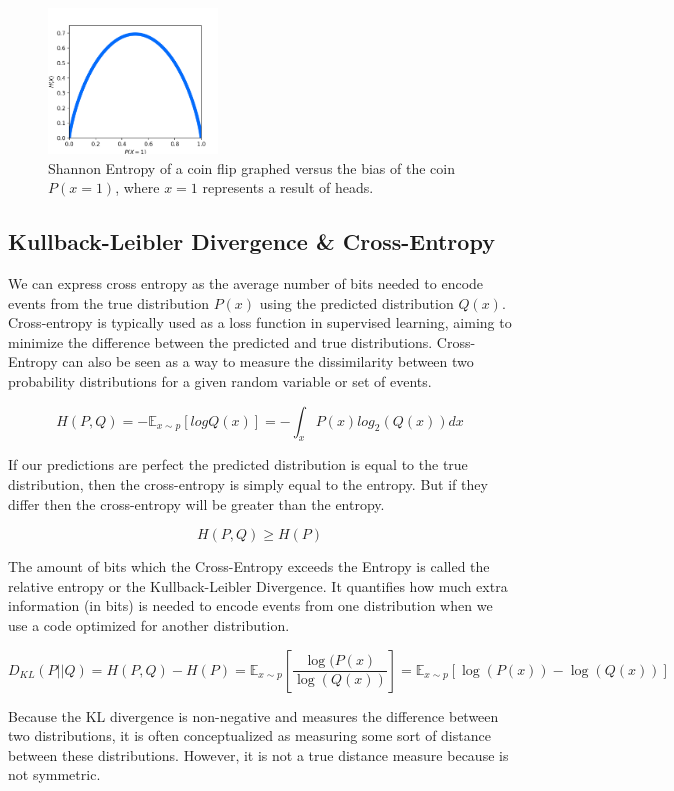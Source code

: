 \begin{figure}[h]
    \centering
    \includegraphics[width=4.5cm]{Plots/self-entropy.png}
    \caption{Shannon Entropy of a coin flip graphed versus the bias of the coin $P(x=1)$, where $x=1$ represents a result of heads.}
\end{figure}

\newpage
\subsection{Kullback-Leibler Divergence \& Cross-Entropy}

We can express cross entropy as the average number of bits needed to encode events from the true distribution $P(x)$ using the predicted distribution $Q(x)$. Cross-entropy is typically used as a loss function in supervised learning, aiming to minimize the difference between the predicted and true distributions. Cross-Entropy can also be seen as a way to measure the dissimilarity between two probability distributions for a given random variable or set of events.

$$H(P, Q) = - \mathbb{E}_{x \sim p} [{log Q(x)}] = -\int_x {P(x)log_2\left(Q(x)\right)dx} $$

\noindent If our predictions are perfect the predicted distribution is equal to the true distribution, then the cross-entropy is simply equal to the entropy. But if they differ then the cross-entropy will be greater than the entropy. 

$$ H(P, Q) \geq H(P) $$

\noindent The amount of bits which the Cross-Entropy exceeds the Entropy is called the relative entropy or the Kullback-Leibler Divergence. It quantifies how much extra information (in bits) is needed to encode events from one distribution when we use a code optimized for another distribution.

$$ D_{KL} (P \vert \vert Q) = H(P, Q) - H(P) = \mathbb{E}_{x \sim p} \left[ \frac{\log(P(x)}{\log(Q(x))} \right] = \mathbb{E}_{x \sim p} \left[ \log(P(x)) - \log(Q(x))  \right] $$

\noindent Because the KL divergence is non-negative and measures the difference between two distributions, it is often conceptualized as measuring some sort of distance between these distributions. However, it is not a true distance measure because is not symmetric.

